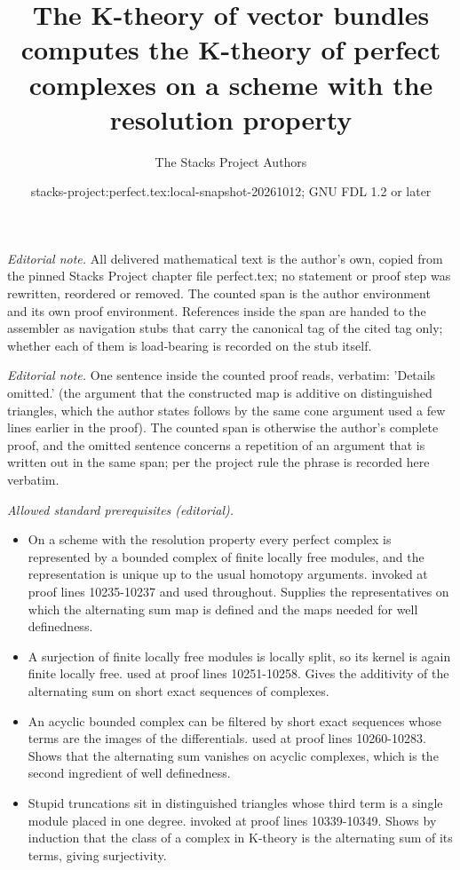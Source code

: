 \documentclass{stacks-project}
\title{The K-theory of vector bundles computes the K-theory of perfect complexes on a scheme with the resolution property}
\author{The Stacks Project Authors}
\date{stacks-project:perfect.tex:local-snapshot-20261012; GNU FDL 1.2 or later}
\theoremstyle{plain}
\theoremstyle{definition}
\theoremstyle{remark}
\numberwithin{equation}{subsection}
\begin{document}
\maketitle
\setcounter{subsection}{1}
\noindent\textit{Editorial note.} All delivered mathematical text is the author's own, copied from the pinned Stacks Project chapter file perfect.tex; no statement or proof step was rewritten, reordered or removed. The counted span is the author environment and its own proof environment. References inside the span are handed to the assembler as navigation stubs that carry the canonical tag of the cited tag only; whether each of them is load-bearing is recorded on the stub itself.\par\medskip
\noindent\textit{Editorial note.} One sentence inside the counted proof reads, verbatim: 'Details omitted.' (the argument that the constructed map is additive on distinguished triangles, which the author states follows by the same cone argument used a few lines earlier in the proof). The counted span is otherwise the author's complete proof, and the omitted sentence concerns a repetition of an argument that is written out in the same span; per the project rule the phrase is recorded here verbatim.\par\medskip
\noindent\textit{Allowed standard prerequisites (editorial).}\begin{itemize}
\item On a scheme with the resolution property every perfect complex is represented by a bounded complex of finite locally free modules, and the representation is unique up to the usual homotopy arguments. invoked at proof lines 10235-10237 and used throughout. Supplies the representatives on which the alternating sum map is defined and the maps needed for well definedness.
\item A surjection of finite locally free modules is locally split, so its kernel is again finite locally free. used at proof lines 10251-10258. Gives the additivity of the alternating sum on short exact sequences of complexes.
\item An acyclic bounded complex can be filtered by short exact sequences whose terms are the images of the differentials. used at proof lines 10260-10283. Shows that the alternating sum vanishes on acyclic complexes, which is the second ingredient of well definedness.
\item Stupid truncations sit in distinguished triangles whose third term is a single module placed in one degree. invoked at proof lines 10339-10349. Shows by induction that the class of a complex in K-theory is the alternating sum of its terms, giving surjectivity.
\end{itemize}\medskip
\end{document}

